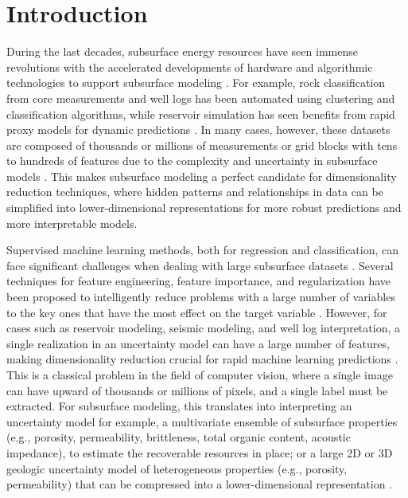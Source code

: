 \documentclass[a4paper,fleqn,12pt]{article}
\begin{document}
\section*{Introduction}
During the last decades, subsurface energy resources have seen immense revolutions with the accelerated developments of hardware and algorithmic technologies to support subsurface modeling \cite{mohammadpoor2020big, latrach2024critical}. For example, rock classification from core measurements and well logs has been automated using clustering and classification algorithms, while reservoir simulation has seen benefits from rapid proxy models for dynamic predictions \cite{raheem2024best, mao2024efficient, morales2024arc, morales2024abc}. In many cases, however, these datasets are composed of thousands or millions of measurements or grid blocks with tens to hundreds of features due to the complexity and uncertainty in subsurface models \cite{Rashid201321, 2021AGUFM.H25O1207S, mao2024cushion}. This makes subsurface modeling a perfect candidate for dimensionality reduction techniques, where hidden patterns and relationships in data can be simplified into lower-dimensional representations for more robust predictions and more interpretable models. 

Supervised machine learning methods, both for regression and classification, can face significant challenges when dealing with large subsurface datasets \cite{tariq2021systematic, sircar2021application}. Several techniques for feature engineering, feature importance, and regularization have been proposed to intelligently reduce problems with a large number of variables to the key ones that have the most effect on the target variable \cite{cai2018feature, zheng2018feature}. However, for cases such as reservoir modeling, seismic modeling, and well log interpretation, a single realization in an uncertainty model can have a large number of features, making dimensionality reduction crucial for rapid machine learning predictions \cite{misra2019machine, bhattacharya2021primer, morales2025anisotropic}. This is a classical problem in the field of computer vision, where a single image can have upward of thousands or millions of pixels, and a single label must be extracted. For subsurface modeling, this translates into interpreting an uncertainty model for example, a multivariate ensemble of subsurface properties (e.g., porosity, permeability, brittleness, total organic content, acoustic impedance), to estimate the recoverable resources in place; or a large 2D or 3D geologic uncertainty model of heterogeneous properties (e.g., porosity, permeability) that can be compressed into a lower-dimensional representation \cite{morales2024stochastic, jiang2023use}.
\end{document}
